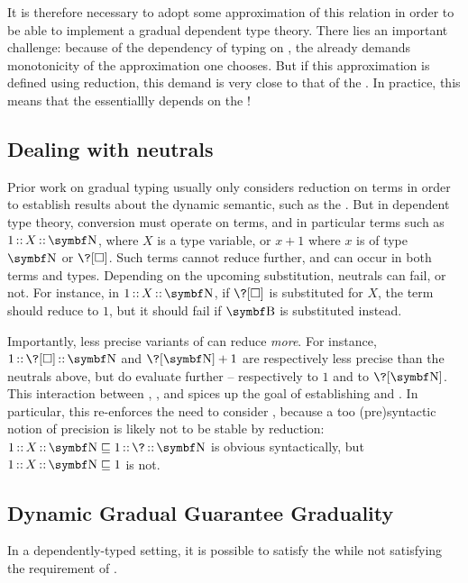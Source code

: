 It is therefore necessary to adopt some approximation of this relation
in order to be able to implement a gradual dependent type theory.
There lies an important challenge: because of the dependency of typing on ,
the  already demands monotonicity of the approximation
one chooses. But if this approximation is defined using reduction, this demand is
very close to that of the .%
In practice, this means that the  essentiallly depends on the !

\subsection{Dealing with neutrals}
Prior work on gradual typing usually only considers reduction on  terms in order to establish results about the dynamic semantic, such as the .
%
But in dependent type theory, conversion must operate on  terms,
and in particular  terms such as $\asc{\asc{1}{X}}{\Nat}$,
where $X$ is a type variable, or $x + 1$ where $x$ is of type $\Nat$ or $\?[\uni]$.
%
Such  terms cannot reduce further, and can occur in both terms and types.
Depending on the upcoming substitution, neutrals can fail, or not. For instance, in $\asc{\asc{1}{X}}{\Nat}$, if $\?[\uni]$ is substituted for $X$, the term should reduce to $1$,
but it should fail if $\Bool$ is substituted instead.

Importantly, less precise variants of  can reduce \emph{more}.
For instance, $\asc{\asc{1}{\?[\uni]}}{\Nat}$ and $\?[\Nat] + 1$ are respectively
less precise than the neutrals above, but do evaluate further – respectively to $1$
and to $\?[\Nat]$. This interaction between , , and 
spices up the goal of establishing  and .
In particular, this re-enforces the need to consider , because a
too \kl(pre){syntactic} notion of precision is likely not to be stable by reduction:
$\asc{\asc{1}{X}}{\Nat} \pre \asc{\asc{1}{\?}}{\Nat}$ is obvious syntactically,
but $\asc{\asc{1}{X}}{\Nat} \pre 1$ is not.

\subsection{Dynamic Gradual Guarantee \vs Graduality}
In a dependently-typed setting, it is possible to satisfy the  while not satisfying the  requirement of .

